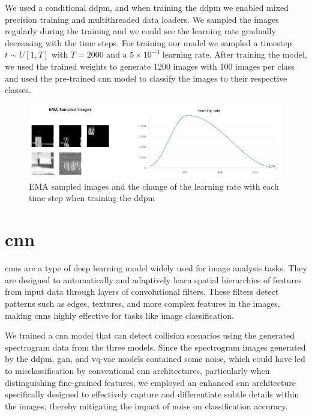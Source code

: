 We used a conditional \gls{ddpm}, and when training the \gls{ddpm} we enabled mixed precision training and multithreaded data loaders. We sampled the images regularly during the training and we could see the learning rate gradually decreasing with the time steps. 
For training our model we sampled a timestep $t\sim U[1,T]$ with $T=2000$ and a $5\times10^{-3}$ learning rate.
After training the model, we used the trained weights to generate 1200 images with 100 images per class and used the pre-trained \gls{cnn} model to classify the images to their respective classes. 
\begin{figure}[h]
\includegraphics[width=\textwidth]{figures/ema_learning_rate.jpg}
\centering
\caption{EMA sampled images and the change of the learning rate with each time step when training the \gls{ddpm} }
\centering
\end{figure}
\section{\gls{cnn}}
\gls{cnn}s are a type of deep learning model widely used for image analysis tasks. They are designed to automatically and adaptively learn spatial hierarchies of features from input data through layers of convolutional filters. These filters detect patterns such as edges, textures, and more complex features in the images, making \gls{cnn}s highly effective for tasks like image classification.


We trained a \gls{cnn} model that can detect collision scenarios using the generated spectrogram data from the three models. 
Since the spectrogram images generated by the \gls{ddpm}, \gls{gan}, and \gls{vq-vae} models contained some noise, which could have led to misclassification by conventional \gls{cnn} architectures, particularly when distinguishing fine-grained features,  we employed an enhanced \gls{cnn} architecture specifically designed to effectively capture and differentiate subtle details within the images, thereby mitigating the impact of noise on classification accuracy.

